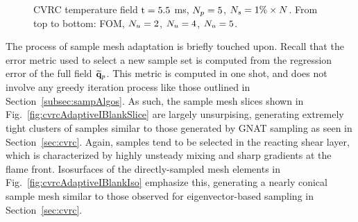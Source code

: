 \begin{figure}
\begin{minipage}{0.99\linewidth}
	\end{minipage}
    \begin{minipage}{0.99\linewidth}
	\end{minipage}
    \caption{\label{fig:cvrcAdaptiveFieldsTemp}CVRC temperature field $\text{t} = 5.5$ ms, $N_p = 5$, $N_s = 1\% \times N$. From top to bottom: FOM, $N_u = 2$, $N_u = 4$, $N_u = 5$.}
\end{figure}

The process of sample mesh adaptation is briefly touched upon. Recall that the error metric used to select a new sample set is computed from the regression error of the full field $\mathbf{\widetilde{q}}_{p}$. This metric is computed in one shot, and does not involve any greedy iteration process like those outlined in Section~\ref{subsec:sampAlgos}. As such, the sample mesh slices shown in Fig.~\ref{fig:cvrcAdaptiveIBlankSlice} are largely unsurpising, generating extremely tight clusters of samples similar to those generated by GNAT sampling as seen in Section~\ref{sec:cvrc}. Again, samples tend to be selected in the reacting shear layer, which is characterized by highly unsteady mixing and sharp gradients at the flame front. Isosurfaces of the directly-sampled mesh elements in Fig.~\ref{fig:cvrcAdaptiveIBlankIso} emphasize this, generating a nearly conical sample mesh similar to those observed for eigenvector-based sampling in Section~\ref{sec:cvrc}.

